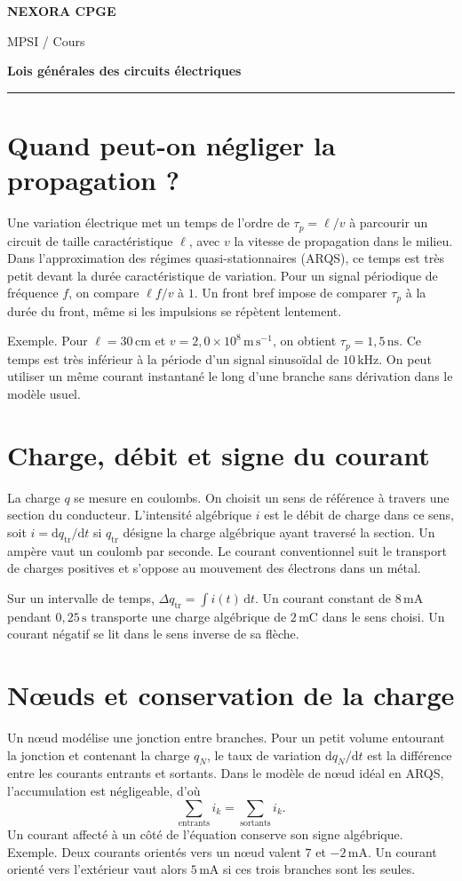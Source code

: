 \documentclass[11pt,a4paper]{article}
\begin{document}
{\small\bfseries\color{nexorablue} NEXORA CPGE}\par
{\small MPSI / Cours}\par
{\LARGE\bfseries Lois générales des circuits électriques}\par
\vspace{0.25em}\hrule\vspace{0.6em}

\section*{Quand peut-on négliger la propagation ?}
Une variation électrique met un temps de l’ordre de $\tau_p=\ell/v$ à parcourir un circuit de taille caractéristique $\ell$, avec $v$ la vitesse de propagation dans le milieu. Dans l’approximation des régimes quasi-stationnaires (ARQS), ce temps est très petit devant la durée caractéristique de variation. Pour un signal périodique de fréquence $f$, on compare $\ell f/v$ à $1$. Un front bref impose de comparer $\tau_p$ à la durée du front, même si les impulsions se répètent lentement.

Exemple. Pour $\ell=30\,\mathrm{cm}$ et $v=2{,}0\times10^8\,\mathrm{m\,s^{-1}}$, on obtient $\tau_p=1{,}5\,\mathrm{ns}$. Ce temps est très inférieur à la période d’un signal sinusoïdal de $10\,\mathrm{kHz}$. On peut utiliser un même courant instantané le long d’une branche sans dérivation dans le modèle usuel.

\section*{Charge, débit et signe du courant}
La charge $q$ se mesure en coulombs. On choisit un sens de référence à travers une section du conducteur. L’intensité algébrique $i$ est le débit de charge dans ce sens, soit $i=\mathrm dq_{\mathrm{tr}}/\mathrm dt$ si $q_{\mathrm{tr}}$ désigne la charge algébrique ayant traversé la section. Un ampère vaut un coulomb par seconde. Le courant conventionnel suit le transport de charges positives et s’oppose au mouvement des électrons dans un métal.

Sur un intervalle de temps, $\Delta q_{\mathrm{tr}}=\int i(t)\,\mathrm dt$. Un courant constant de $8\,\mathrm{mA}$ pendant $0{,}25\,\mathrm s$ transporte une charge algébrique de $2\,\mathrm{mC}$ dans le sens choisi. Un courant négatif se lit dans le sens inverse de sa flèche.

\section*{Nœuds et conservation de la charge}
Un nœud modélise une jonction entre branches. Pour un petit volume entourant la jonction et contenant la charge $q_N$, le taux de variation $\mathrm dq_N/\mathrm dt$ est la différence entre les courants entrants et sortants. Dans le modèle de nœud idéal en ARQS, l’accumulation est négligeable, d’où
\[ \sum_{\mathrm{entrants}} i_k=\sum_{\mathrm{sortants}} i_k. \]
Un courant affecté à un côté de l’équation conserve son signe algébrique. Exemple. Deux courants orientés vers un nœud valent $7$ et $-2\,\mathrm{mA}$. Un courant orienté vers l’extérieur vaut alors $5\,\mathrm{mA}$ si ces trois branches sont les seules.
\end{document}
